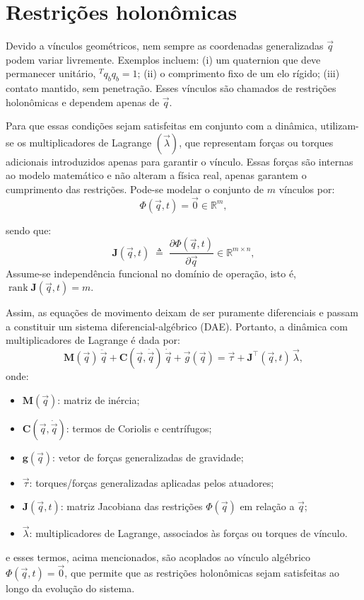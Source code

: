 \section{Restrições holonômicas}
\label{sec:restricoes_holonomicas}

Devido a vínculos geométricos, nem sempre as coordenadas generalizadas $\vec q$ podem variar livremente. Exemplos incluem:
(i) um quaternion que deve permanecer unitário, ${}^T q_b q_b=1$;
(ii) o comprimento fixo de um elo rígido;
(iii) contato mantido, sem penetração.
Esses vínculos são chamados de restrições holonômicas e dependem apenas de $\vec q$.

Para que essas condições sejam satisfeitas em conjunto com a dinâmica, utilizam-se os multiplicadores de Lagrange $(\vec \lambda)$, que representam forças ou torques adicionais introduzidos apenas para garantir o vínculo.
Essas forças são internas ao modelo matemático e não alteram a física real, apenas garantem o cumprimento das restrições.
Pode-se modelar o conjunto de $m$ vínculos por:
\begin{equation}
\Phi(\vec q,t)=
\vec 0\in\mathbb {R}^{m},
\label{eq:PhiJ1}
\end{equation}

sendo que:
\begin{equation}
\mathbf{J}(\vec q,t)\;\triangleq\;\frac{\partial \Phi(\vec q,t)}{\partial \vec q}\in\mathbb {R}^{m\times n},
\label{eq:PhiJ2}
\end{equation}
Assume-se independência funcional no domínio de operação, isto é, $\operatorname{rank}\mathbf{J}(\vec q,t)=m$.

Assim, as equações de movimento deixam de ser puramente diferenciais e passam a constituir um sistema diferencial-algébrico (DAE).
Portanto, a dinâmica com multiplicadores de Lagrange é dada por:
\begin{equation}
\mathbf M(\vec q)\,\ddot{\vec q}
+\mathbf C(\vec q,\dot{\vec q})\,\dot{\vec q}
+\vec g(\vec q)=
\vec\tau+\mathbf{J}^{\top}(\vec q,t)\,\vec\lambda,
\label{eq:dinamica_mult_lagrange}
\end{equation}
onde:
\begin{itemize}
    \item $\mathbf{M}(\vec{q})$: matriz de inércia;
    \item $\mathbf{C}(\vec{q},\dot{\vec{q}})$: termos de Coriolis e centrífugos;
    \item $\mathbf{g}(\vec{q})$: vetor de forças generalizadas de gravidade;
    \item $\vec{\tau}$: torques/forças generalizadas aplicadas pelos atuadores;
    \item $\mathbf{J}(\vec q,t)$: matriz Jacobiana das restrições $\Phi(\vec q)$ em relação a $\vec q$;
    \item $\vec{\lambda}$: multiplicadores de Lagrange, associados às forças ou torques de vínculo.
\end{itemize}
e esses termos, acima mencionados, são acoplados ao vínculo algébrico $\Phi(\vec q,t)=\vec 0$, que permite que as restrições holonômicas sejam satisfeitas ao longo da evolução do sistema.

